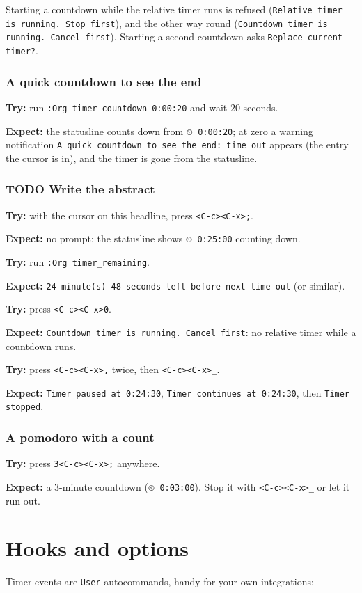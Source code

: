 Starting a countdown while the relative timer runs is refused
(\texttt{Relative timer is running.  Stop first}), and the other way round
(\texttt{Countdown timer is running.  Cancel first}). Starting a second countdown
asks \texttt{Replace current timer?}.
\subsubsection{A quick countdown to see the end}
\label{sec:orgd81a00d}
\textbf{Try:} run \texttt{:Org timer\_countdown 0:00:20} and wait 20 seconds.

\textbf{Expect:} the statusline counts down from \texttt{⏲ 0:00:20}; at zero a warning
notification \texttt{A quick countdown to see the end: time out} appears (the
entry the cursor is in), and the timer is gone from the statusline.
\subsubsection{{\bfseries\sffamily TODO} Write the abstract}
\label{sec:orgc8c3ec6}
\textbf{Try:} with the cursor on this headline, press \texttt{<C-c><C-x>;}.

\textbf{Expect:} no prompt; the statusline shows \texttt{⏲ 0:25:00} counting down.

\textbf{Try:} run \texttt{:Org timer\_remaining}.

\textbf{Expect:} \texttt{24 minute(s) 48 seconds left before next time out} (or similar).

\textbf{Try:} press \texttt{<C-c><C-x>0}.

\textbf{Expect:} \texttt{Countdown timer is running.  Cancel first}: no relative timer
while a countdown runs.

\textbf{Try:} press \texttt{<C-c><C-x>,} twice, then \texttt{<C-c><C-x>\_}.

\textbf{Expect:} \texttt{Timer paused at 0:24:30}, \texttt{Timer continues at 0:24:30}, then
\texttt{Timer stopped}.
\subsubsection{A pomodoro with a count}
\label{sec:orgbc77e6e}
\textbf{Try:} press \texttt{3<C-c><C-x>;} anywhere.

\textbf{Expect:} a 3-minute countdown (\texttt{⏲ 0:03:00}). Stop it with
\texttt{<C-c><C-x>\_} or let it run out.
\section{Hooks and options}
\label{sec:org3ec8003}
Timer events are \texttt{User} autocommands, handy for your own integrations:

